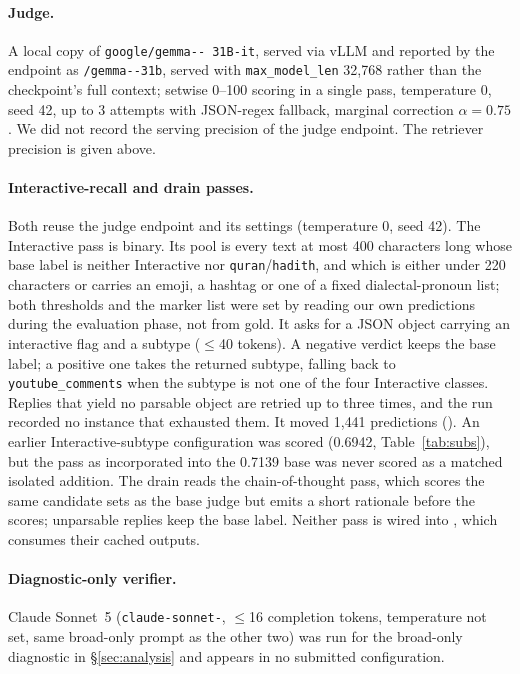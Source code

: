 \documentclass[11pt]{article}
\begin{document}
\paragraph{Judge.} A local copy of \texttt{google/\allowbreak gemma--\allowbreak
31B-\allowbreak it}, served via vLLM and reported by the endpoint as
\texttt{/gemma--\allowbreak 31b}, served with \texttt{max\_\allowbreak model\_\allowbreak len} 32{,}768
rather than the checkpoint's full context; setwise
0--100 scoring in a single pass,
temperature 0, seed 42, up to 3 attempts with JSON-regex fallback, marginal correction
$\alpha{=}0.75$. We did not record the serving precision of the judge endpoint. The retriever precision is given above.

\paragraph{Interactive-recall and drain passes.} Both reuse the judge endpoint and its
settings (temperature 0, seed 42). The Interactive pass is binary. Its pool is every text at most 400 characters long whose base
label is neither Interactive nor \texttt{quran}/\texttt{hadith}, and which is either under 220
characters or carries an emoji, a hashtag or one of a fixed dialectal-pronoun list; both
thresholds and the marker list were set by reading our own predictions during the evaluation
phase, not from gold. It asks for a JSON object carrying an interactive flag and a subtype
($\leq$40 tokens). A negative verdict keeps the base label; a positive one takes the returned
subtype, falling back to \texttt{youtube\_\allowbreak comments} when the subtype is not one of
the four Interactive classes. Replies that yield no parsable object are retried up to three
times, and the run recorded no instance that exhausted them. It moved 1{,}441 predictions
(). An earlier Interactive-subtype configuration was scored
(0.6942, Table~\ref{tab:subs}), but the pass as incorporated into the 0.7139 base was never
scored as a matched isolated addition. The drain reads the chain-of-thought pass, which scores the
same candidate sets as the base judge but emits a short rationale before the scores; unparsable
replies keep the base label. Neither pass is wired into , which consumes
their cached outputs.

\paragraph{Diagnostic-only verifier.} Claude Sonnet~5 (\texttt{claude-\allowbreak sonnet-}, $\leq$16
completion tokens, temperature not set, same broad-only prompt as the other two) was run for the broad-only
diagnostic in \S\ref{sec:analysis} and appears in no submitted configuration.
\end{document}
